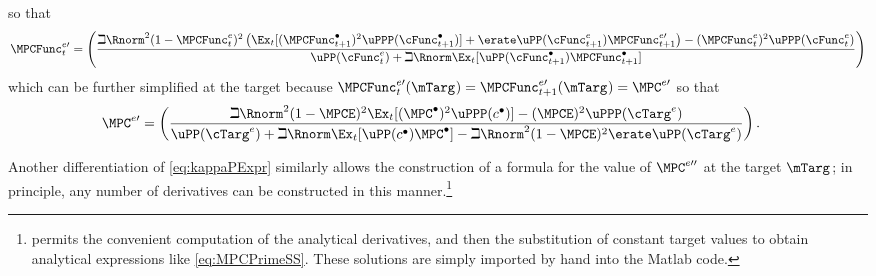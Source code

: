 \documentclass{handout}
\begin{document}
so that
\begin{equation}\begin{gathered}\begin{aligned}
\MPCFunc^{e\prime}_{t}   & =  \left(\frac{\beth \Rnorm^{2} (1-\MPCFunc^{e}_{t})^{2} \left( \Ex_{t}[(\MPCFunc_{t+1}^{\bullet})^{2}\uPPP(\cFunc^{\bullet}_{t+1})] +\erate \uPP(\cFunc^{e}_{t+1}) \MPCFunc^{e \prime}_{t+1}\right)-(\MPCFunc^{e}_{t})^{2} \uPPP(\cFunc^{e}_{t})}{\uPP(\cFunc^{e}_{t})+\beth \Rnorm \Ex_{t}[\uPP(\cFunc^{\bullet}_{t+1})\MPCFunc^{\bullet}_{t+1}]  }\right) \nonumber \\ \label{eq:kappaPReverse}
\end{aligned}\end{gathered}\end{equation}
which can be further simplified at the target because $\MPCFunc^{e \prime}_{t}(\mTarg^{\null}) = \MPCFunc^{e \prime}_{t+1}(\mTarg^{\null}) = \MPC^{e \prime}$ so that
\begin{equation}\begin{gathered}\begin{aligned}
\MPC^{e\prime} & =  \left(\frac{\beth \Rnorm^{2} (1-\MPCE)^{2}\Ex_{t}[(\MPC^{\bullet})^{2} \uPPP(c^{\bullet})] -(\MPCE)^{2} \uPPP(\cTarg^{e})}{\uPP(\cTarg^{e}) + \beth \Rnorm \Ex_{t}[\uPP(c^{\bullet})\MPC^{\bullet}]- \beth \Rnorm^{2} (1-\MPCE)^{2}\erate \uPP(\cTarg^{e})}\right) \label{eq:MPCPrimeSS}
.
\end{aligned}\end{gathered}\end{equation}

Another differentiation of \eqref{eq:kappaPExpr} similarly allows the construction of a formula for the value of $\MPC^{e \prime\prime}$ at the target $\mTarg^{\null}$; in principle, any number of derivatives can be 
constructed in this manner.\footnote{\Mma permits the convenient computation of the analytical derivatives, and then the substitution of constant target values to obtain analytical expressions like \eqref{eq:MPCPrimeSS}.  These solutions are simply imported by hand into the Matlab code.}
\end{document}
